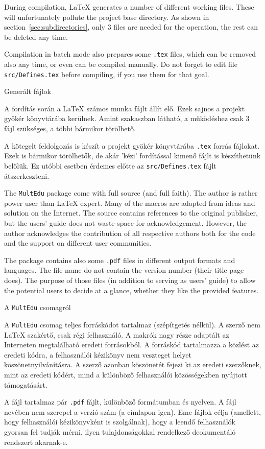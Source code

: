 {
During compilation, \LaTeX{} generates a number of different working files.
These will unfortunately pollute the project base directory. As shown
in section~\ref{sec:subdirectories}, only 3 files are needed for the operation,
the rest can be deleted any time.

Compilation in batch mode also prepares some \lstinline|.tex| files,
which can be removed also any time, or even can be compiled manually. 
Do not forget to edit file \lstinline|src/Defines.tex| before compiling,
if you use them for that goal.
}
{Generált fájlok}
{
A fordítás során a \LaTeX{} számos munka fájlt állít elő.
Ezek sajnos a projekt gyökér könyvtárába kerülnek. Amint  szakaszban látható, a működéshez csak 3 fájl szükséges,
a többi bármikor törölhető.

A kötegelt feldolgozás is készít a projekt gyökér könyvtárába \lstinline|.tex| 
forrás fájlokat. Ezek is bármikor törölhetők, de akár 'kézi' fordítással kimenő fájlt is készíthetünk belőlük. Ez utóbbi esetben érdemes előtte az
 \lstinline|src/Defines.tex| fájlt átszerkeszteni.
}
%


{The \lstinline|MultEdu| package come with full source (and full faith).
The author is rather power user than \LaTeX{} expert. Many of the macros
are adapted from ideas and solution on the Internet. The source contains
references to the original publisher, but the users' guide does not waste space 
for acknowledgement. However, the author acknowledges the contribution
of all respective authors both for the code and the support on different user communities.

The package contains also some \lstinline|.pdf| files in different output
formats and languages. The file name do not contain the version number
(their title page does). The purpose of those files (in addition to
serving as users' guide) to allow the potential users to decide at a glance,
whether they like the provided features.
}
{A \lstinline|MultEdu| csomagról}
{A \lstinline|MultEdu| csomag teljes forráskódot tartalmaz (szépítgetés nélkül).
A szerző nem \LaTeX{} szakértő, csak régi felhasználó.
A makrók nagy része adaptált az Interneten megtalálható eredeti forrásokból.
A forráskód tartalmazza a közlést az eredeti kódra, a felhasználói kézikönyv
nem veszteget  helyet köszönetnyilvánításra. A szerző azonban köszönetét fejezi 
ki az eredeti szerzőknek, mint az eredeti kódért, mind a különböző
felhasználói közösségekben nyújtott támogatásárt.

A fájl tartalmaz pár \lstinline|.pdf| fájlt, különböző formátumban és nyelven.
A fájl nevében nem szerepel a verzió szám (a címlapon igen).
Eme fájlok célja (amellett, hogy felhasználói kézikönyvként is szolgálnak),
hogy a leendő felhasználók gyorsan fel tudják mérni, ilyen tulajdonságokkal
rendelkező deokumentáló rendszert akarnak-e.
}

